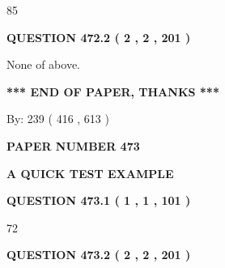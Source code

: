 \documentclass[12pt]{article}
\begin{document}
85
 
 
  
\vspace{0.2in}
  
{\textbf{\Large{QUESTION
472.2 
 ( 2 , 2 , 201 )
}}}
  
  
 
 
\noindent{}
 
 
 None of above.
 
 
 
 
   
   
 \vspace{0.2in}
 
   
   
   
   
\vspace{1.0in} 
{\textbf{\large{ *** END OF PAPER, THANKS *** }}} 
   
   
\hspace{1.0in} By: 
 239 ( 416 ,  613 )
   
   
   
   
\newpage 
\setcounter{page}{ 
   473001 } 
   
   
   
   
 {\textbf{ \Large{ PAPER NUMBER  473  }}}
   
   
\vspace{0.2in}
   
   
   
   
   
   
 \vspace{0.2in}
{\LARGE {\textbf{ A QUICK TEST EXAMPLE}}}
   
   
  
\vspace{0.2in}
  
{\textbf{\Large{QUESTION
473.1 
 ( 1 , 1 , 101 )
}}}
  
  
 
 
\noindent{}

72
 
 
  
\vspace{0.2in}
  
{\textbf{\Large{QUESTION
473.2 
 ( 2 , 2 , 201 )
}}}
  
  
 
\end{document}
